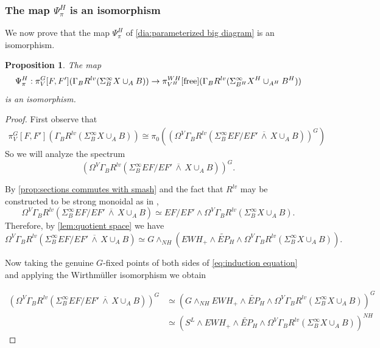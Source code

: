 \documentclass[11pt]{amsart}
\newcommand{\beforesubsection}{\vspace{1em}}
\newcommand{\aftersubsection}{}
\newcommand{\free}{\textup{free}}
\newcommand{\barsmash}{\,\overline\wedge\,}
\theoremstyle{plain}   %
\newtheorem{prop}[thm]{Proposition}
\theoremstyle{definition}
\theoremstyle{remark}
\numberwithin{equation}{section}
\begin{document}
\beforesubsection
\subsubsection{The map $\Psi_\pi^H$ is an isomorphism}\aftersubsection

We now prove that the map $\Psi_\pi^H$ of \cref{dia:parameterized big diagram} is an isomorphism.

\begin{prop}\label{prop:parameterized fixed point iso}
The map 
\[
\Psi_\pi^H:\pi_V^G[F,F'](\Gamma_BR^{lv}(\Sigma^\infty_B X\cup_A B))\to \pi_{V^H}^{WH}[\free](\Gamma_BR^{lv}(\Sigma^\infty_{B^H} X^H\cup_{A^H} B^H))
\]
is an isomorphism. 
\end{prop}

\begin{proof}
First observe that 
\begin{align*}
\pi_V^G[F,F'](\Gamma_BR^{lv}(\Sigma_B^\infty X\cup_AB)) \cong \pi_0((\Omega^V\Gamma_BR^{lv}(\Sigma_B^\infty EF/EF'\barsmash X\cup_AB))^G)
\end{align*}
So we will analyze the spectrum
\[
(\Omega^V\Gamma_BR^{lv}(\Sigma_B^\infty EF/EF'\barsmash X\cup_A B))^G.
\]

By \cref{prop:sections commutes with smash} and the fact that $R^{lv}$ may be constructed to be strong monoidal as in \cite{malkiewich_convenient}, 
\[
\Omega^V\Gamma_BR^{lv}(\Sigma_B^\infty EF/EF'\barsmash X\cup_A B) \simeq EF/EF'\wedge \Omega^V\Gamma_BR^{lv}(\Sigma_B^\infty X\cup_A B).
\]
Therefore, by \cref{lem:quotient space} we have
\begin{equation}\label{eq:induction equation}
\Omega^V\Gamma_BR^{lv}(\Sigma_B^\infty EF/EF'\barsmash X\cup_A B) \simeq G\wedge_{NH}(EWH_+\wedge \widetilde{EP}_H\wedge \Omega^V\Gamma_BR^{lv}(\Sigma_B^\infty X\cup_A B)).
\end{equation}

Now taking the genuine $G$-fixed points of both sides of \cref{eq:induction equation} and applying the Wirthm\"uller isomorphism \cite[3.2.15]{schwede_global} we obtain

\begin{align*}
(\Omega^V\Gamma_BR^{lv}(\Sigma_B^\infty EF/EF'\barsmash X\cup_A B))^G
& \simeq (G\wedge_{NH}EWH_+\wedge \widetilde{EP}_H\wedge \Omega^V\Gamma_BR^{lv}(\Sigma_B^\infty X\cup_A B))^G\\
& \simeq (S^L\wedge EWH_+\wedge \widetilde{EP}_H\wedge\Omega^V\Gamma_BR^{lv}(\Sigma_B^\infty X\cup_A B))^{NH}
\end{align*}


\end{proof}
\end{document}
